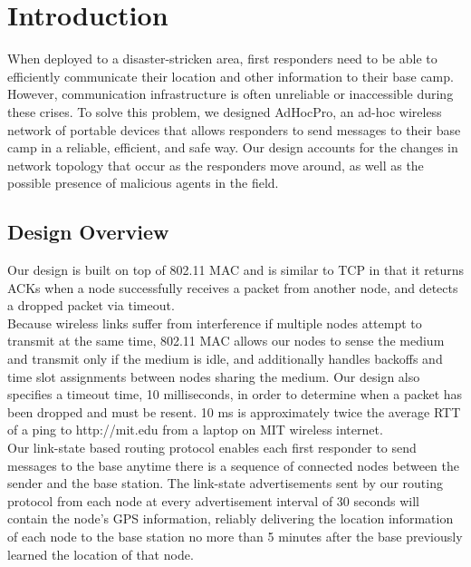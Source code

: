 \documentclass[letterpaper]{article}
\begin{document}
\section{Introduction}

When deployed to a disaster-stricken area, first responders need to be able to efficiently communicate their
location and other information to their base camp. However, communication infrastructure is often unreliable
or inaccessible during these crises. To solve this problem, we designed AdHocPro, an ad-hoc wireless network of
portable devices that allows responders to send messages to their base camp in a reliable, efficient, and safe
way. Our design accounts for the changes in network topology that occur as the responders move 
around, as well as the possible presence of malicious agents in the field. 

\subsection{Design Overview}

Our design is built on top of 802.11 MAC and is similar to TCP in that it returns ACKs when a node successfully receives
a packet from another node, and detects a dropped packet via timeout.
\\

\noindent Because wireless links suffer from interference if multiple nodes attempt to transmit at the same time,
802.11 MAC allows our nodes to sense the medium and transmit only if the medium is idle, and additionally handles
backoffs and time slot assignments between nodes sharing the medium. Our design also specifies a timeout time, 
10 milliseconds, in order to determine when a packet has been dropped and must be resent. 10 ms is approximately 
twice the average RTT of a ping to http://mit.edu from a laptop on MIT wireless internet.
\\

\noindent Our link-state based routing protocol enables each first responder to send messages to the base anytime
there is a sequence of connected nodes between the sender and the base station. The link-state advertisements 
sent by our routing protocol from each node at every advertisement interval of 30 seconds will contain the node's
GPS  information, reliably delivering the location information of each node to the base station no more than
5 minutes after the base previously learned the location of that node.
\\
\end{document}
